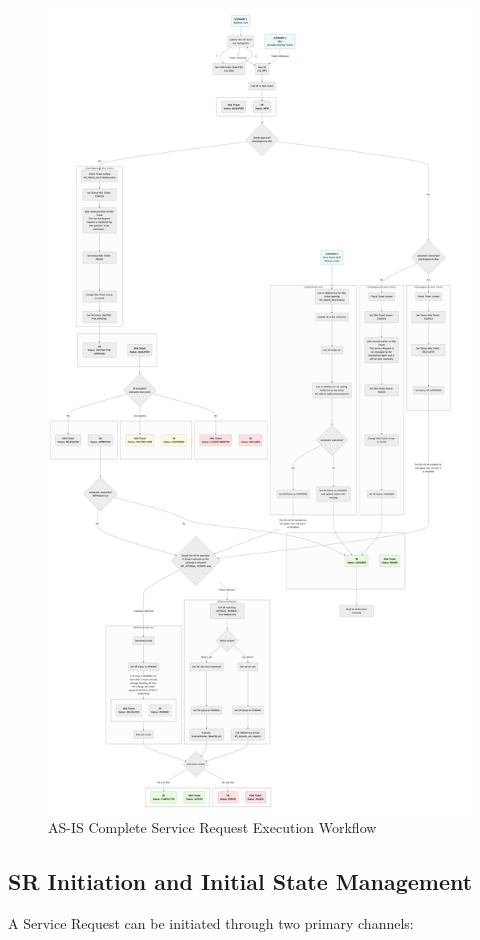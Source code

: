 \begin{figure}[htbp]
    \centering
    \includegraphics[height=\textheight, keepaspectratio]{images/as-is/Flowchart AS-IS.jpg}
    \caption{AS-IS Complete Service Request Execution Workflow}
    \label{fig:flowchart-as-is}
\end{figure}

\subsection{SR Initiation and Initial State Management}
A Service Request can be initiated through two primary channels:

